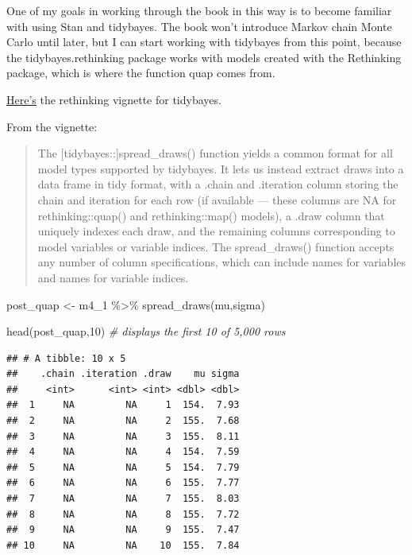 \documentclass[
]{book}
\newenvironment{Shaded}{\begin{snugshade}}{\end{snugshade}}
\newcommand{\CommentTok}[1]{\textcolor[rgb]{0.56,0.35,0.01}{\textit{#1}}}
\newcommand{\DecValTok}[1]{\textcolor[rgb]{0.00,0.00,0.81}{#1}}
\newcommand{\FunctionTok}[1]{\textcolor[rgb]{0.00,0.00,0.00}{#1}}
\newcommand{\NormalTok}[1]{#1}
\newcommand{\OtherTok}[1]{\textcolor[rgb]{0.56,0.35,0.01}{#1}}
\newcommand{\SpecialCharTok}[1]{\textcolor[rgb]{0.00,0.00,0.00}{#1}}
\begin{document}
One of my goals in working through the book in this way is to become familiar with using Stan and tidybayes. The book won't introduce Markov chain Monte Carlo until later, but I can start working with tidybayes from this point, because the tidybayes.rethinking package works with models created with the Rethinking package, which is where the function quap comes from.

\href{https://mjskay.github.io/tidybayes.rethinking/articles/tidy-rethinking.html}{Here's} the rethinking vignette for tidybayes.

From the vignette:

\begin{quote}
The {[}tidybayes::{]}spread\_draws() function yields a common format for all model types supported by tidybayes. It lets us instead extract draws into a data frame in tidy format, with a .chain and .iteration column storing the chain and iteration for each row (if available --- these columns are NA for rethinking::quap() and rethinking::map() models), a .draw column that uniquely indexes each draw, and the remaining columns corresponding to model variables or variable indices. The spread\_draws() function accepts any number of column specifications, which can include names for variables and names for variable indices.
\end{quote}

\begin{Shaded}
\begin{Highlighting}[]
\NormalTok{post\_quap }\OtherTok{\textless{}{-}}\NormalTok{ m4\_1 }\SpecialCharTok{\%\textgreater{}\%}
  \FunctionTok{spread\_draws}\NormalTok{(mu,sigma)}

\FunctionTok{head}\NormalTok{(post\_quap,}\DecValTok{10}\NormalTok{) }\CommentTok{\# displays the first 10 of 5,000 rows}
\end{Highlighting}
\end{Shaded}

\begin{verbatim}
## # A tibble: 10 x 5
##    .chain .iteration .draw    mu sigma
##     <int>      <int> <int> <dbl> <dbl>
##  1     NA         NA     1  154.  7.93
##  2     NA         NA     2  155.  7.68
##  3     NA         NA     3  155.  8.11
##  4     NA         NA     4  154.  7.59
##  5     NA         NA     5  154.  7.79
##  6     NA         NA     6  155.  7.77
##  7     NA         NA     7  155.  8.03
##  8     NA         NA     8  155.  7.72
##  9     NA         NA     9  155.  7.47
## 10     NA         NA    10  155.  7.84
\end{verbatim}
\end{document}

